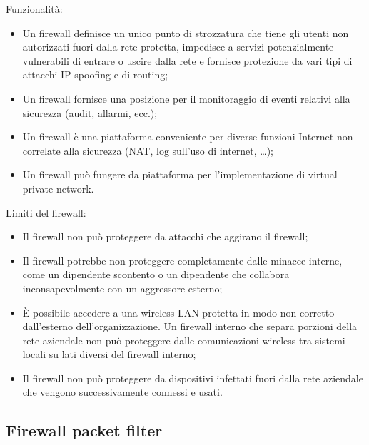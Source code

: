 Funzionalità:
\begin{itemize}
    \item Un firewall definisce un unico punto di strozzatura che tiene gli utenti non autorizzati fuori dalla rete protetta, impedisce a servizi potenzialmente vulnerabili di entrare o uscire dalla rete e fornisce protezione da vari tipi di attacchi IP spoofing e di routing;
	\item Un firewall fornisce una posizione per il monitoraggio di eventi relativi alla sicurezza (audit, allarmi, ecc.);
	\item Un firewall è una piattaforma conveniente per diverse funzioni Internet non correlate alla sicurezza (NAT, log sull'uso di internet, …);
	\item Un firewall può fungere da piattaforma per l'implementazione di virtual private network.
\end{itemize}

Limiti del firewall:
\begin{itemize}
    \item  Il firewall non può proteggere da attacchi che aggirano il firewall;
	\item Il firewall potrebbe non proteggere completamente dalle minacce interne, come un dipendente scontento o un dipendente che collabora inconsapevolmente con un aggressore esterno;
	\item È possibile accedere a una wireless LAN protetta in modo non corretto dall'esterno dell'organizzazione. Un firewall interno che separa porzioni della rete aziendale non può proteggere dalle comunicazioni wireless tra sistemi locali su lati diversi del firewall interno;
	\item Il firewall non può proteggere da dispositivi infettati fuori dalla rete aziendale che vengono successivamente connessi e usati.
\end{itemize}

\subsection{Firewall packet filter}

